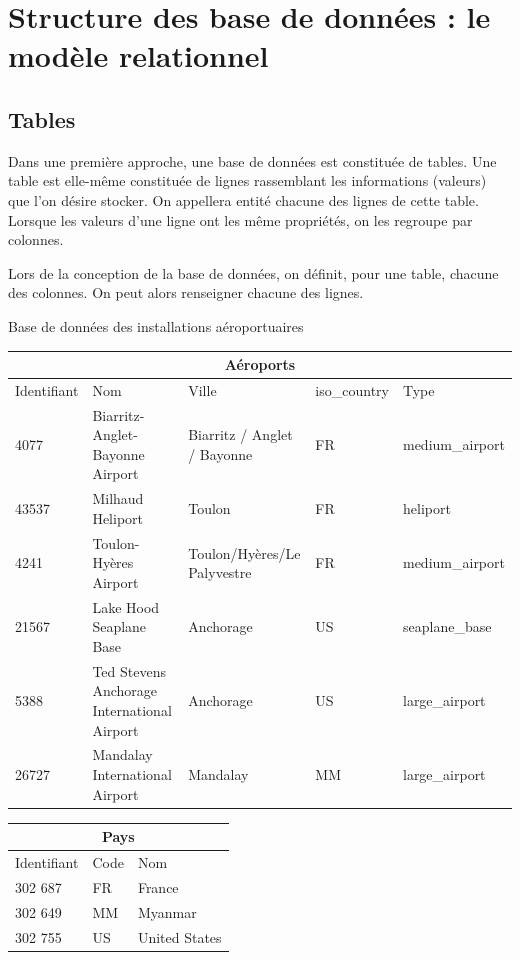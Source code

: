 \documentclass[10pt,fleqn]{article} %
\begin{document}
\section{Structure des base de données : le modèle relationnel}
\subsection{Tables}
Dans une première approche, une base de données est constituée de tables. Une table est elle-même constituée de lignes rassemblant les informations (valeurs) que l'on désire stocker. On appellera entité chacune des lignes de cette table. Lorsque les valeurs d'une ligne ont les même propriétés, on les regroupe par colonnes. 

Lors de la conception de la base de données, on définit, pour une table, chacune des colonnes. On peut alors renseigner chacune des lignes. 

\begin{exemple}
Base de données des installations aéroportuaires
\begin{center}
\begin{tabular}{lp{4cm}p{3cm}ll}
\hline
\multicolumn{5}{c}{Aéroports} \\
\hline
Identifiant & Nom & Ville & iso\_country & Type \\
\hline
\hline
4077 &Biarritz-Anglet-Bayonne Airport & Biarritz / Anglet / Bayonne & FR &  medium\_airport \\
43537 &Milhaud Heliport & Toulon & FR  & heliport \\
4241 &Toulon-Hyères Airport & Toulon/Hyères/Le Palyvestre & FR &  medium\_airport \\
21567 &Lake Hood Seaplane Base & Anchorage & US &   seaplane\_base\\
5388 &Ted Stevens Anchorage International Airport & Anchorage & US & large\_airport\\
26727 &Mandalay International Airport & Mandalay & MM  & large\_airport\\
\hline
\end{tabular}
\end{center}

\begin{center}
\begin{tabular}{lll}
\hline
\multicolumn{3}{c}{Pays} \\
\hline
Identifiant & Code & Nom \\
\hline
\hline
302 687 & FR & France \\
302 649 & MM & Myanmar \\
302 755 & US & United States \\
\hline
\end{tabular}
\end{center}
\end{exemple}
\end{document}
